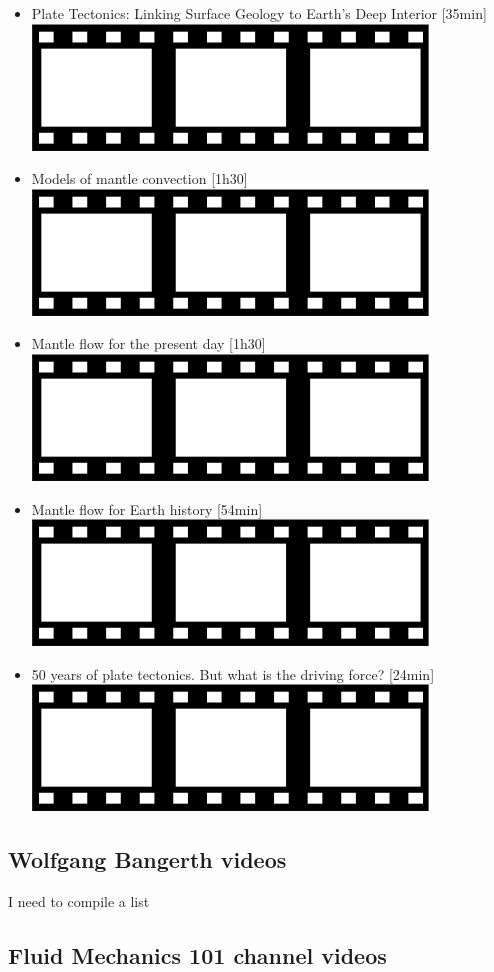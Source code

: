 \begin{itemize}
\item Plate Tectonics: Linking Surface Geology to Earth’s Deep Interior [35min] 
      \href{https://youtu.be/aPuLqiXci14}{\includegraphics[width=.8cm]{images/pictograms/film.png}} 
\item Models of mantle convection [1h30] 
      \href{https://youtu.be/olbSuf6EGPM}{\includegraphics[width=.8cm]{images/pictograms/film.png}}
\item Mantle flow for the present day [1h30] 
      \href{https://youtu.be/aTQ-1Vpncjw}{\includegraphics[width=.8cm]{images/pictograms/film.png}}
\item Mantle flow for Earth history [54min] 
      \href{https://youtu.be/OG5qDon-3_w}{\includegraphics[width=.8cm]{images/pictograms/film.png}}
\item 50 years of plate tectonics. But what is the driving force? [24min] 
      \href{https://youtu.be/4UAdEwbGKiM}{\includegraphics[width=.8cm]{images/pictograms/film.png}}
\end{itemize}

\subsection{Wolfgang Bangerth videos}

{\color{red} I need to compile a list}


\subsection{Fluid Mechanics 101 channel videos}

